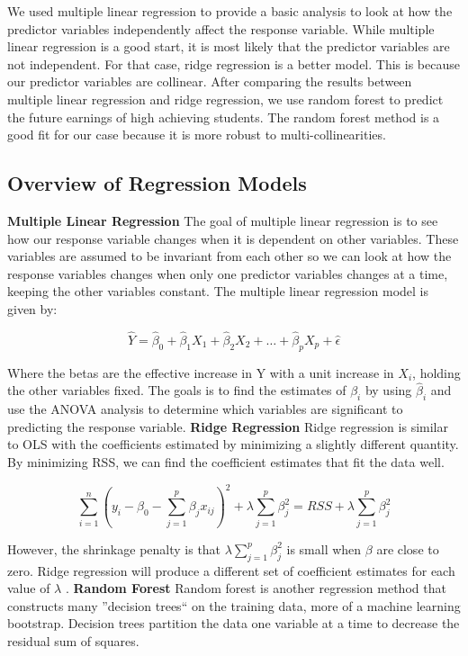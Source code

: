 \documentclass{article}
\begin{document}
  We used multiple linear regression to provide a basic analysis to look at how the predictor variables independently affect the response variable.  
While multiple linear regression is a good start, it is most likely that the predictor variables are not independent.  For that case, ridge regression is a better model.  This is because our predictor variables are collinear.  
After comparing the results between multiple linear regression and ridge regression, we use random forest to predict the future earnings of high achieving students.  The random forest method is a good fit for our case because it is more robust to multi-collinearities. 


\subsection{Overview of Regression Models}

\textbf{Multiple Linear Regression} \newline
The goal of multiple linear regression is to see how our response variable changes when it is dependent on other variables.  These variables are assumed to be invariant from each other so we can look at how the response variables changes when only one predictor variables changes at a time, keeping the other variables constant.  The multiple linear regression model is given by:

$$\hat Y = \hat \beta_0 + \hat \beta_1 X_1 + \hat \beta_2 X_2 + \dots + \hat \beta_p X_p + \hat \epsilon$$

Where the betas are the effective increase in Y with a unit increase in $X_i$, holding the other variables fixed.  
The goals is to find the estimates of $\beta_i$ by using $\hat \beta_i$ and use the ANOVA analysis to determine which variables are significant to predicting the response variable.
\newline
\newline
\textbf{Ridge Regression}\newline
Ridge regression is similar to OLS with the coefficients estimated by minimizing a slightly different quantity.  By minimizing RSS, we can find the coefficient estimates that fit the data well. 

$$\sum_{i=1}^{n}(y_i-\beta_0-\sum_{j=1}^{p}\beta_jx_{ij})^2+\lambda\sum_{j=1}^{p}\beta_j^2 = RSS + \lambda\sum_{j=1}^{p}\beta_j^{2}$$ 

However, the shrinkage penalty is that $\lambda\sum_{j=1}^{p}\beta_j^{2}$ is small when $\beta$ are close to zero. Ridge regression will produce a different set of coefficient estimates for each value of $\lambda$ .
\newline
\newline
\textbf{Random Forest}\newline
Random forest is another regression method that constructs many ''decision trees`` on the training data, more of a machine learning bootstrap.  Decision trees partition the data one variable at a time to decrease the residual sum of squares. 
\end{document}

